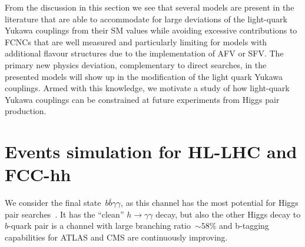 

From the discussion in this section we see that several models are present in the literature that are able to accommodate for large deviations of the light-quark Yukawa couplings from their SM values while avoiding excessive contributions to FCNCs that are well measured and particularly limiting for models with additional flavour structures due to the implementation of AFV or SFV. The primary new physics deviation, complementary to direct searches, in the presented models will show up in the modification of the light quark Yukawa couplings. Armed with this knowledge, we motivate a study of how light-quark Yukawa couplings can be constrained at future experiments from Higgs pair production.


\section{Events simulation for HL-LHC and FCC-hh}
\label{sec:Sim}
We consider the final state~$b \bar{b} \gamma \gamma$, as this channel has the most potential for Higgs pair searches~\cite{Cepeda:2019klc}. It has the ``clean'' $h \to \gamma \gamma$ decay, but also the other Higgs decay to $b$-quark pair is a channel with large branching ratio~$\sim 58\%$ and b-tagging capabilities for ATLAS and CMS are continuously improving.




